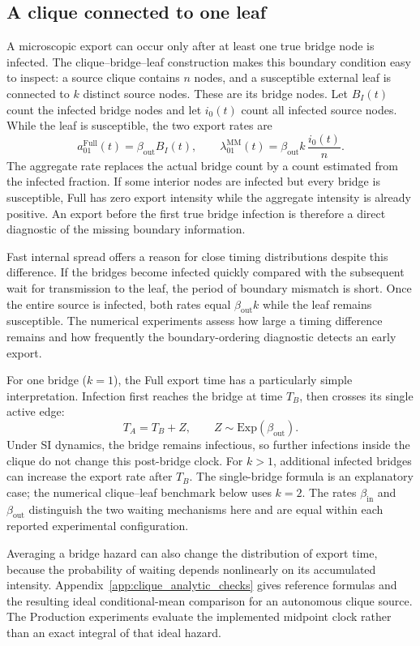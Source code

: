 \documentclass[a4paper,fleqn]{cas-sc}
\begin{document}
\subsection{A clique connected to one leaf}

A microscopic export can occur only after at least one true bridge node is infected. The clique--bridge--leaf construction makes this boundary condition easy to inspect: a source clique contains $n$ nodes, and a susceptible external leaf is connected to $k$ distinct source nodes. These are its bridge nodes. Let $B_I(t)$ count the infected bridge nodes and let $i_0(t)$ count all infected source nodes. While the leaf is susceptible, the two export rates are
\[
a^{\mathrm{Full}}_{01}(t)=\beta_{\mathrm{out}}B_I(t),
\qquad
\lambda^{\mathrm{MM}}_{01}(t)=\beta_{\mathrm{out}}k\,\frac{i_0(t)}{n}.
\]
The aggregate rate replaces the actual bridge count by a count estimated from the infected fraction. If some interior nodes are infected but every bridge is susceptible, Full has zero export intensity while the aggregate intensity is already positive. An export before the first true bridge infection is therefore a direct diagnostic of the missing boundary information.

Fast internal spread offers a reason for close timing distributions despite this difference. If the bridges become infected quickly compared with the subsequent wait for transmission to the leaf, the period of boundary mismatch is short. Once the entire source is infected, both rates equal $\beta_{\mathrm{out}}k$ while the leaf remains susceptible. The numerical experiments assess how large a timing difference remains and how frequently the boundary-ordering diagnostic detects an early export.

For one bridge ($k=1$), the Full export time has a particularly simple interpretation. Infection first reaches the bridge at time $T_B$, then crosses its single active edge:
\[
T_A=T_B+Z,\qquad Z\sim\mathrm{Exp}(\beta_{\mathrm{out}}).
\]
Under SI dynamics, the bridge remains infectious, so further infections inside the clique do not change this post-bridge clock. For $k>1$, additional infected bridges can increase the export rate after $T_B$. The single-bridge formula is an explanatory case; the numerical clique--leaf benchmark below uses $k=2$. The rates $\beta_{\mathrm{in}}$ and $\beta_{\mathrm{out}}$ distinguish the two waiting mechanisms here and are equal within each reported experimental configuration.

Averaging a bridge hazard can also change the distribution of export time, because the probability of waiting depends nonlinearly on its accumulated intensity. Appendix~\ref{app:clique_analytic_checks} gives reference formulas and the resulting ideal conditional-mean comparison for an autonomous clique source. The Production experiments evaluate the implemented midpoint clock rather than an exact integral of that ideal hazard.
\end{document}
